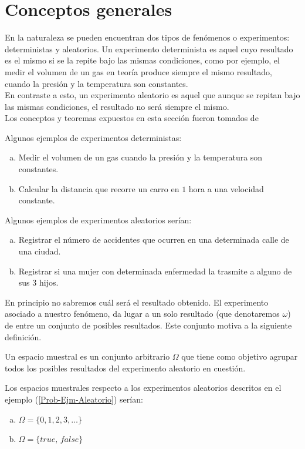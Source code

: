 \section{Conceptos generales}
    En la naturaleza se pueden encuentran dos tipos de fenómenos o experimentos: deterministas y aleatorios. Un experimento determinista es aquel cuyo resultado es el mismo si se la repite bajo las mismas condiciones, como por ejemplo, el medir el volumen de un gas en teoría produce siempre el mismo resultado, cuando la presión y la temperatura son constantes.\\
    En contraste a esto, un experimento aleatorio es aquel que aunque se repitan bajo las mismas condiciones, el resultado no será siempre el mismo.\\
    Los conceptos y teoremas expuestos en esta sección fueron tomados de \cite{Rincon1} \cite{Rincon2}
\begin{Ejm}
    Algunos ejemplos de experimentos deterministas:
    \begin{enumerate}[a)]
        \item Medir el volumen de un gas cuando la presión y la temperatura son constantes.
        \item Calcular la distancia que recorre un carro en $1$ hora a una velocidad constante.
    \end{enumerate}
\end{Ejm}
\begin{Ejm}
\label{Prob-Ejm-Aleatorio}
Algunos ejemplos de experimentos aleatorios serían:
    \begin{enumerate}[a)]
        \item Registrar el número de accidentes que ocurren en una determinada calle de una ciudad.
        \item Registrar si una mujer con  determinada enfermedad la trasmite a alguno de sus 3 hijos.
    \end{enumerate}
\end{Ejm}
En principio no sabremos cuál será el resultado obtenido. El experimento asociado a nuestro fenómeno, da lugar a un solo resultado (que denotaremos $\omega$) de entre un conjunto de posibles resultados. Este conjunto motiva a la siguiente definición.
\begin{Def}
Un espacio muestral es un conjunto arbitrario $\Omega$ que tiene como objetivo agrupar todos los posibles resultados del experimento aleatorio en cuestión.
\end{Def}
\begin{Ejm}
Los espacios muestrales respecto a los experimentos aleatorios descritos en el ejemplo (\ref{Prob-Ejm-Aleatorio}) serían:
\begin{enumerate}[a)]
    \item $\Omega=\{0,1,2,3,\ldots\}$
    \item $\Omega=\{\textit{true, false}\}$
\end{enumerate}
\end{Ejm}
